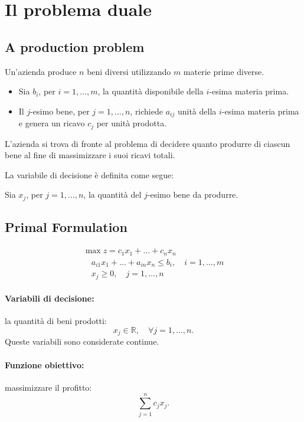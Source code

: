 \documentclass[a4paper, 11pt]{article}
\begin{document}
    \section{Il problema duale}
        
        \subsection{A production problem}
        Un'azienda produce $n$ beni diversi utilizzando $m$ materie prime diverse.

        \begin{itemize}
            \item Sia $b_i$, per $i = 1, \dots, m$, la quantità disponibile della $i$-esima materia prima.
            \item Il $j$-esimo bene, per $j = 1, \dots, n$, richiede $a_{ij}$ unità della $i$-esima materia prima e genera un ricavo $c_j$ per unità prodotta.
        \end{itemize}

        L'azienda si trova di fronte al problema di decidere quanto produrre di ciascun bene al fine di massimizzare i suoi ricavi totali.

        La variabile di decisione è definita come segue:

        Sia $x_j$, per $j = 1, \dots, n$, la quantità del $j$-esimo bene da produrre.


        \subsection{Primal Formulation}

        \begin{align*}
            \max{z} =  c_{1}x_{1} + \dots + c_{n}x_{n} \\
            \quad a_{i1}x_{1} + \dots + a_{in}x_{n} \leq b_{i}, \quad i=1, \dots, m \\
            \quad x_{j} \geq 0, \quad j=1, \dots, n
        \end{align*}

        \paragraph{Variabili di decisione:} la quantità di beni prodotti:
        \[ x_j \in \mathbb{R}, \quad \forall j=1,\dots,n. \]
        Queste variabili sono considerate continue.

        \paragraph{Funzione obiettivo:} massimizzare il profitto:
        \[ \sum_{j=1}^{n} c_j x_j. \]
\end{document}
